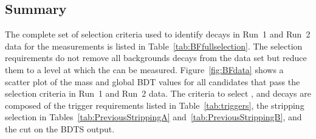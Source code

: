 \subsection{Summary}
\label{sec:BFsummary}
The complete set of selection criteria used to identify \bmumu decays in Run~1 and Run~2 data for the \BF measurements is listed in Table~\ref{tab:BFfullselection}. %
The selection requirements do not remove all backgrounds decays from the data set but reduce them to a level at which the \BFs can be measured. Figure~\ref{fig:BFdata} shows a scatter plot of the mass and global BDT values for all candidates that pass the selection criteria in Run~1 and Run~2 data.
The criteria to select \bhh, \bujpsik and \bsjpsiphi decays are composed of the trigger requirements listed in Table~\ref{tab:triggers}, the stripping selection in Tables~\ref{tab:PreviousStrippingA} and~\ref{tab:PreviousStrippingB}, and the cut on the BDTS output.

